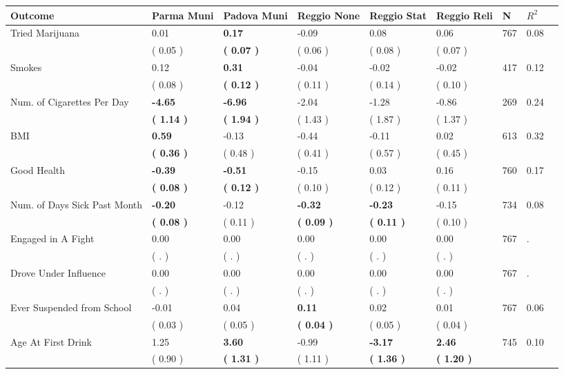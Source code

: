 \begin{tabular}{L{6.2cm} C{1.8cm} C{1.8cm} C{1.8cm} C{1.8cm} C{1.8cm} C{1.8cm} C{0.3cm} C{0.3cm}}
\toprule
 \textbf{Outcome} & \textbf{Parma Muni} & \textbf{Padova Muni} & \textbf{Reggio None} & \textbf{Reggio Stat} & \textbf{Reggio Reli} & \textbf{N} & \textbf{$ R^2$} \\
\midrule
Tried Marijuana &      0.01 & \textbf{     0.17} &     -0.09 &      0.08 &      0.06  & 767 &       0.08 \\ 
 & (     0.05 ) & \textbf{(     0.07 )} & (     0.06 ) & (     0.08 ) & (     0.07 )  & \\
Smokes &      0.12 & \textbf{     0.31} &     -0.04 &     -0.02 &     -0.02  & 417 &       0.12 \\ 
 & (     0.08 ) & \textbf{(     0.12 )} & (     0.11 ) & (     0.14 ) & (     0.10 )  & \\
Num. of Cigarettes Per Day & \textbf{    -4.65} & \textbf{    -6.96} &     -2.04 &     -1.28 &     -0.86  & 269 &       0.24 \\ 
 & \textbf{(     1.14 )} & \textbf{(     1.94 )} & (     1.43 ) & (     1.87 ) & (     1.37 )  & \\
BMI & \textbf{     0.59} &     -0.13 &     -0.44 &     -0.11 &      0.02  & 613 &       0.32 \\ 
 & \textbf{(     0.36 )} & (     0.48 ) & (     0.41 ) & (     0.57 ) & (     0.45 )  & \\
Good Health & \textbf{    -0.39} & \textbf{    -0.51} &     -0.15 &      0.03 &      0.16  & 760 &       0.17 \\ 
 & \textbf{(     0.08 )} & \textbf{(     0.12 )} & (     0.10 ) & (     0.12 ) & (     0.11 )  & \\
Num. of Days Sick Past Month & \textbf{    -0.20} &     -0.12 & \textbf{    -0.32} & \textbf{    -0.23} &     -0.15  & 734 &       0.08 \\ 
 & \textbf{(     0.08 )} & (     0.11 ) & \textbf{(     0.09 )} & \textbf{(     0.11 )} & (     0.10 )  & \\
Engaged in A Fight &      0.00 &      0.00 &      0.00 &      0.00 &      0.00  & 767 &          . \\ 
 & (        . ) & (        . ) & (        . ) & (        . ) & (        . )  & \\
Drove Under Influence &      0.00 &      0.00 &      0.00 &      0.00 &      0.00  & 767 &          . \\ 
 & (        . ) & (        . ) & (        . ) & (        . ) & (        . )  & \\
Ever Suspended from School &     -0.01 &      0.04 & \textbf{     0.11} &      0.02 &      0.01  & 767 &       0.06 \\ 
 & (     0.03 ) & (     0.05 ) & \textbf{(     0.04 )} & (     0.05 ) & (     0.04 )  & \\
Age At First Drink &      1.25 & \textbf{     3.60} &     -0.99 & \textbf{    -3.17} & \textbf{     2.46}  & 745 &       0.10 \\ 
 & (     0.90 ) & \textbf{(     1.31 )} & (     1.11 ) & \textbf{(     1.36 )} & \textbf{(     1.20 )}  & \\
\bottomrule
\end{tabular}
